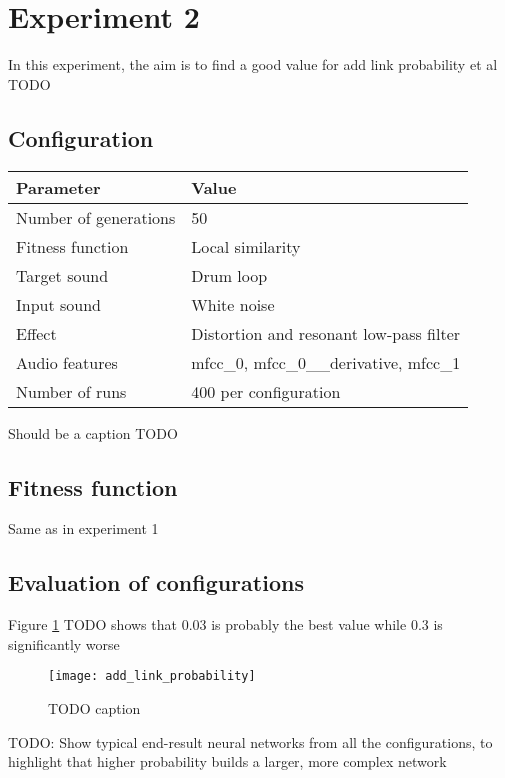 \section{Experiment 2}
In this experiment, the aim is to find a good value for add link probability et al TODO

\subsection{Configuration}
\begin{minipage}{\linewidth}
\centering
{} \label{tab:title} 
\begin{tabular}{ C{3.5in} C{1.6in} }\toprule[1.5pt]
\bf Parameter & \bf Value \\
\midrule
  Number of generations & 50 \\
\midrule
  Fitness function & Local similarity \\
\midrule
  Target sound & Drum loop \\
\midrule
  Input sound & White noise \\
\midrule
  Effect & Distortion and resonant low-pass filter \\
\midrule
  Audio features & mfcc\_0, mfcc\_0\_\_derivative, mfcc\_1 \\
\midrule
  Number of runs & 400 per configuration \\
\bottomrule[1.25pt]
\end {tabular}\par
\bigskip
Should be a caption TODO
\end{minipage}

\subsection{Fitness function}
Same as in experiment 1

\subsection{Evaluation of configurations}
Figure \ref{fig:add_link_probability} TODO shows that 0.03 is probably the best value while 0.3 is significantly worse

\begin{figure}[h]
    \centering
    \texttt{[image: add\_link\_probability]}
    \caption{TODO caption}
    \label{fig:add_link_probability}
\end{figure}

TODO: Show typical end-result neural networks from all the configurations, to highlight that higher probability builds a larger, more complex network